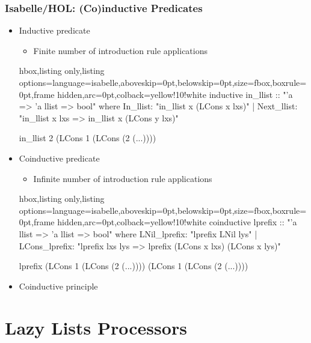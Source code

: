 \documentclass[aspectratio=169,10pt]{beamer}
\begin{document}
\begin{frame}[fragile]
  \frametitle{Isabelle/HOL: (Co)inductive Predicates}
  \begin{itemize}
    \item Inductive predicate
          \begin{itemize}
            \item Finite number of introduction rule applications
          \end{itemize}
          \vspace*{-1ex}
          \begin{tcblisting}{hbox,listing only,listing options={language=isabelle,aboveskip=0pt,belowskip=0pt},size=fbox,boxrule=0pt,frame hidden,arc=0pt,colback=yellow!10!white}
inductive in_llist :: "'a => 'a llist => bool" where
  In_llist: "in_llist x (LCons x lxs)"
| Next_llist: "in_llist x lxs => in_llist x (LCons y lxs)"

in_llist 2 (LCons 1 (LCons (2 (...))))
          \end{tcblisting}
          \vspace*{-1ex}
          \pause
    \item Coinductive predicate
          \begin{itemize}
            \item Infinite number of introduction rule applications
          \end{itemize}
          \vspace*{-1ex}
          \begin{tcblisting}{hbox,listing only,listing options={language=isabelle,aboveskip=0pt,belowskip=0pt},size=fbox,boxrule=0pt,frame hidden,arc=0pt,colback=yellow!10!white}
coinductive lprefix :: "'a llist => 'a llist => bool" where
  LNil_lprefix: "lprefix LNil lys"
| LCons_lprefix: "lprefix lxs lys => lprefix (LCons x lxs) (LCons x lys)"

lprefix (LCons 1 (LCons (2 (...)))) (LCons 1 (LCons (2 (...))))
          \end{tcblisting}
          \vspace*{-1ex}
          \pause
    \item Coinductive principle
  \end{itemize}
\end{frame}

\section{Lazy Lists Processors}
\end{document}
